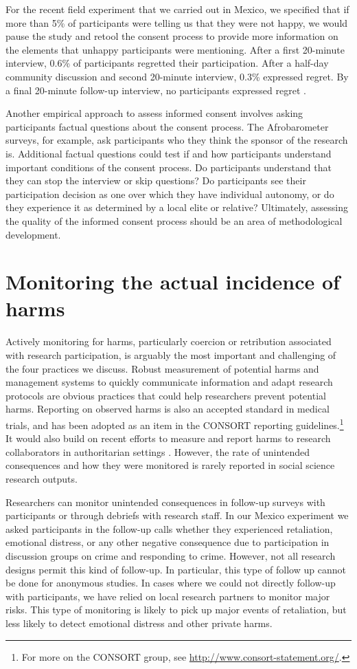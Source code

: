 For the recent field experiment that we carried out in Mexico, we specified that if more than 5\% of participants were telling us that they were not happy, we would pause the study and retool the consent process to provide more information on the elements that unhappy participants were mentioning. After a first 20-minute interview, 0.6\% of participants regretted their participation. After a half-day community discussion and second 20-minute interview, 0.3\% expressed regret. By a final 20-minute follow-up interview, no participants expressed regret \citep{baron2020lab}.

Another empirical approach to assess informed consent involves asking participants factual questions about the consent process. The Afrobarometer surveys, for example, ask participants who they think the sponsor of the research is. Additional factual questions could test if and how participants understand important conditions of the consent process. Do participants understand that they can stop the interview or skip questions? Do participants see their participation decision as one over which they have individual autonomy, or do they experience it as determined by a local elite or relative? Ultimately, assessing the quality of the informed consent process should be an area of methodological development. 

\section{Monitoring the actual incidence of harms}

Actively monitoring for harms, particularly coercion or retribution associated with research participation, is arguably the most important and challenging of the four practices we discuss. Robust measurement of potential harms and management systems to quickly communicate information and adapt research protocols are obvious practices that could help researchers prevent potential harms. Reporting on observed harms is also an accepted standard in medical trials, and has been adopted as an item in the CONSORT reporting guidelines.\footnote{For more on the CONSORT group, see \url{http://www.consort-statement.org/}.} It would also build on recent efforts to measure and report harms to research collaborators in authoritarian settings \citep{grietens2019repressive}. However, the rate of unintended consequences and how they were monitored is rarely reported in social science research outputs. 

Researchers can monitor unintended consequences in follow-up surveys with participants or through debriefs with research staff. In our Mexico experiment we asked participants in the follow-up calls whether they experienced retaliation, emotional distress, or any other negative consequence due to participation in discussion groups on crime and responding to crime. However, not all research designs permit this kind of follow-up. In particular, this type of follow up cannot be done for anonymous studies. In cases where we could not directly follow-up with participants, we have relied on local research partners to monitor major risks.  This type of monitoring is likely to pick up major events of retaliation, but less likely to detect emotional distress and other private harms. 

